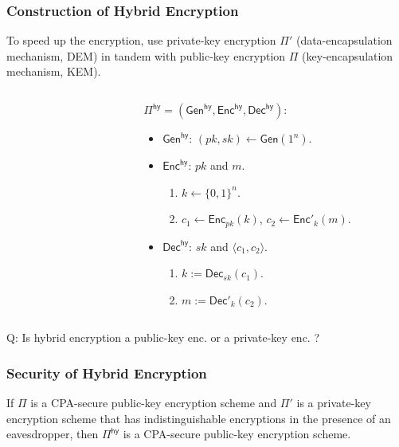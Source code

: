 \begin{frame}\frametitle{Construction of Hybrid Encryption}
To speed up the encryption, use private-key encryption $\Pi'$ (data-encapsulation mechanism, DEM) in tandem with public-key encryption $\Pi$ (key-encapsulation mechanism, KEM).
\begin{columns}
\begin{column}{5cm}
\begin{figure}
\begin{center}

\end{center}
\end{figure}
\end{column}
\begin{column}{5cm}
\begin{construction}
$\Pi^{\mathsf{hy}} = (\mathsf{Gen}^{\mathsf{hy}}, \mathsf{Enc}^{\mathsf{hy}}, \mathsf{Dec}^{\mathsf{hy}})$:
\begin{itemize}
\item $\mathsf{Gen}^{\mathsf{hy}}$: $(pk,sk) \gets \mathsf{Gen}(1^n)$.
\item $\mathsf{Enc}^{\mathsf{hy}}$: $pk$ and $m$. 
\begin{enumerate}
\item $k \gets \{0,1\}^n$.
\item $c_1 \gets \mathsf{Enc}_{pk}(k)$, $c_2 \gets \mathsf{Enc}'_{k}(m)$.
\end{enumerate}
\item $\mathsf{Dec}^{\mathsf{hy}}$: $sk$ and $\langle c_1,c_2\rangle$.
\begin{enumerate}
\item $k := \mathsf{Dec}_{sk}(c_1)$.
\item $m := \mathsf{Dec}'_k(c_2)$.
\end{enumerate}
\end{itemize}
\end{construction}
\end{column}
\end{columns}
\alert{Q: Is hybrid encryption a public-key enc. or a private-key enc. ?}
\end{frame}
\begin{frame}\frametitle{Security of Hybrid Encryption}
\begin{theorem}
If $\Pi$ is a CPA-secure public-key encryption scheme and $\Pi'$ is a private-key encryption scheme that has indistinguishable encryptions in the presence of an eavesdropper, then $\Pi^{\mathsf{hy}}$ is a CPA-secure public-key encryption scheme.
\end{theorem}
\begin{figure}
\begin{center}

\end{center}
\end{figure}
\end{frame}
